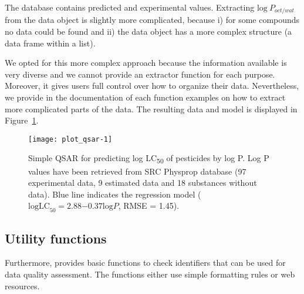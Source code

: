 \documentclass[article, shortnames]{jss}\usepackage[]{graphicx}\usepackage[]{color}
\begin{document}
The database contains predicted and experimental values.
Extracting $\mathrm{log}~P_{oct/wat}$ from the data object is slightly more complicated,  
because i) for some compounds no data could be found and ii) the data object has a more complex structure (a data frame within a list).

\begin{CodeChunk}
\end{CodeChunk}

We opted for this more complex approach because the information available is very diverse and we cannot provide an extractor function for each purpose.
Moreover, it gives users full control over how to organize their data. 
Nevertheless, we provide in the documentation of each function examples on how to extract more complicated parts of the data.
The resulting data and model is displayed in Figure~\ref{fig:fig3}.

\begin{figure}[ht]
\begin{CodeChunk}


{\centering \texttt{[image: plot\_qsar-1]} 

}

\end{CodeChunk}
\caption{Simple QSAR for predicting log LC\textsubscript{50} of pesticides by log P. 
Log P values have been retrieved from SRC Physprop database (97 experimental data, 9 estimated data and 18 substances without data). 
Blue line indicates the regression model ($\mathrm{log LC}_{50} = 2.88\ensuremath{-0.37} \mathrm{log} P$, RMSE = 1.45).}
\label{fig:fig3}
\end{figure}


\subsection[Utility functions]{Utility functions}
Furthermore,  provides basic functions to check identifiers that can be used for data quality assessment.
The functions either use simple formatting rules or web resources.
\end{document}

